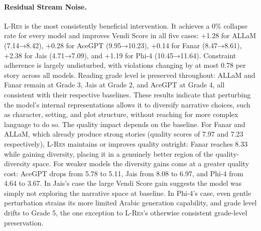 \documentclass[11pt]{article}
\begin{document}
\paragraph{Residual Stream Noise.}
\textsc{L-Res} is the most consistently beneficial intervention. It achieves a 0\% collapse rate for every model and improves Vendi Score in all five cases: +1.28 for ALLaM (7.14→8.42), +0.28 for AceGPT (9.95→10.23), +0.14 for Fanar (8.47→8.61), +2.38 for Jais (4.71→7.09), and +1.19 for Phi-4 (10.45→11.64). Constraint adherence is largely undisturbed, with violations changing by at most 0.78 per story across all models. Reading grade level is preserved throughout: ALLaM and Fanar remain at Grade 3, Jais at Grade 2, and AceGPT at Grade 4, all consistent with their respective baselines. These results indicate that perturbing the model's internal representations allows it to diversify narrative choices, such as character, setting, and plot structure, without reaching for more complex language to do so. The quality impact depends on the baseline. For Fanar and ALLaM, which already produce strong stories (quality scores of 7.97 and 7.23 respectively), \textsc{L-Res} maintains or improves quality outright: Fanar reaches 8.33 while gaining diversity, placing it in a genuinely better region of the quality-diversity space. For weaker models the diversity gains come at a greater quality cost: AceGPT drops from 5.78 to 5.11, Jais from 8.08 to 6.97, and Phi-4 from 4.64 to 3.67. In Jais's case the large Vendi Score gain suggests the model was simply not exploring the narrative space at baseline. In Phi-4's case, even gentle perturbation strains its more limited Arabic generation capability, and grade level drifts to Grade 5, the one exception to \textsc{L-Res}'s otherwise consistent grade-level preservation.
\vspace{-1em}
\end{document}
